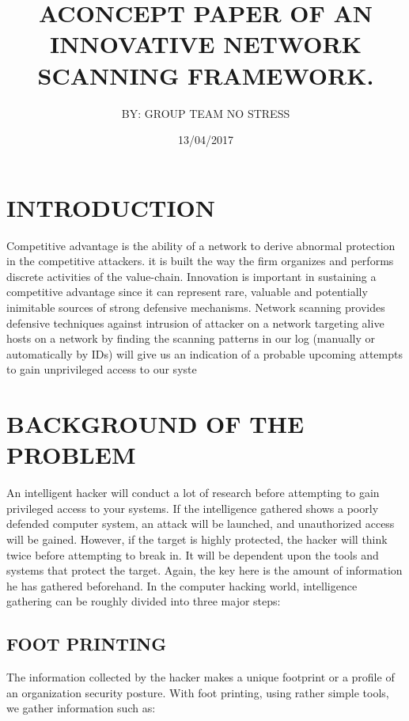 \documentclass{article}
\begin{document}
\title{ ACONCEPT PAPER OF AN  INNOVATIVE NETWORK SCANNING FRAMEWORK.}

\author{ BY: GROUP TEAM NO STRESS}
\date {13/04/2017}

\maketitle

\tableofcontents

\section{INTRODUCTION}\label{sec:into}
Competitive advantage is the ability of a network to derive abnormal protection in the competitive attackers. it is built the way the firm organizes and performs discrete activities of the value-chain. Innovation   is important in sustaining a competitive  advantage since it can represent rare, valuable and potentially inimitable sources of  strong defensive mechanisms.
Network scanning provides   defensive techniques against intrusion of attacker on a network  targeting alive hosts on a network  by finding the scanning patterns in our log (manually or automatically by IDs) will give us an indication of a probable upcoming attempts to gain unprivileged access to our syste

\section{BACKGROUND OF THE PROBLEM}\label{sec:into}
An intelligent hacker will conduct a lot of research before attempting to gain privileged access
to your systems.
If the intelligence gathered shows a poorly defended computer system, an attack will be
launched, and unauthorized access will be gained.
However, if the target is highly protected, the hacker will think twice before attempting to
break in. It will be dependent upon the tools and systems that protect the target.
Again, the key here is the amount of information he has gathered beforehand.
In the computer hacking world, intelligence gathering can be roughly divided into three major
steps:

\subsection{FOOT PRINTING}\label{sec:into}
The information collected by the hacker makes a unique footprint or a profile
of an organization security posture.
With foot printing, using rather simple tools, we gather information such as:
 
\end{document}
